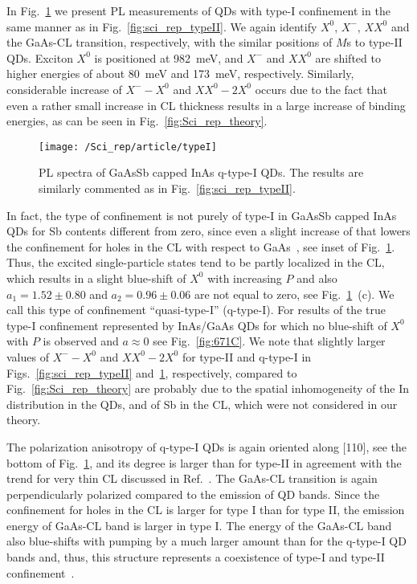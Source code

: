 In Fig.~\ref{fig:scirep_typeIq} we present PL measurements of QDs with type-I confinement in the same manner as in Fig.~\ref{fig:sci_rep_typeII}. We again identify $X^0$, $X^-$, $XX^0$ and the GaAs-CL transition, respectively, with the similar positions of $M$s to type-II QDs. Exciton $X^0$ is positioned at 982~meV, and $X^-$ and $XX^0$ are shifted to higher energies of about 80~meV and 173~meV, respectively. Similarly, considerable increase of $X^--X^0$ and $XX^0-2X^0$ occurs due to the fact that even a rather small increase in CL thickness results in a large increase of binding energies, as can be seen in Fig.~\ref{fig:Sci_rep_theory}. 
%
\begin{figure}
	\centering
	\texttt{[image: /Sci\_rep/article/typeI]}
	\caption{PL spectra of GaAsSb capped InAs q-type-I QDs. The results are similarly commented as in Fig.~\ref{fig:sci_rep_typeII}.}
	\label{fig:scirep_typeIq}
\end{figure}
%
In fact, the type of confinement is not purely of type-I in GaAsSb capped InAs QDs for Sb contents different from zero, since even a slight increase of that lowers the confinement for holes in the CL with respect to GaAs~\cite{Klenovsky10}, see inset of Fig.~\ref{fig:scirep_typeIq}. Thus, the excited single-particle states tend to be partly localized in the CL, which results in a slight blue-shift of $X^0$ with increasing $P$ and also $a_1=1.52\pm0.80$ and $a_2=0.96\pm0.06$ are not equal to zero, see Fig.~\ref{fig:scirep_typeIq}~(c). We call this type of confinement \enquote{quasi-type-I} (q-type-I). For results of the true type-I confinement represented by InAs/GaAs QDs for which no blue-shift of $X^0$ with $P$ is observed and $a\approx0$ see Fig.~\ref{fig:671C}. We note that slightly larger values of $X^--X^0$ and $XX^0-2X^0$ for type-II and q-type-I in Figs.~\ref{fig:sci_rep_typeII} and~\ref{fig:scirep_typeIq}, respectively, compared to Fig.~\ref{fig:Sci_rep_theory} are probably due to the spatial inhomogeneity of the In distribution in the QDs, and of Sb in the CL, which were not considered in our theory. 

The polarization anisotropy of q-type-I QDs is again oriented along [110], see the bottom of Fig.~\ref{fig:scirep_typeIq}, and its degree is larger than for type-II in agreement with the trend for very thin CL discussed in Ref.~\citep{Klenovsky2017}. The GaAs-CL transition is again perpendicularly polarized compared to the emission of QD bands. Since the confinement for holes in the CL is larger for type I than for type II, the emission energy of GaAs-CL band is larger in type I. The energy of the GaAs-CL band also blue-shifts with pumping by a much larger amount than for the q-type-I QD bands and, thus, this structure represents a coexistence of type-I and type-II confinement~\cite{Ji2015}.


